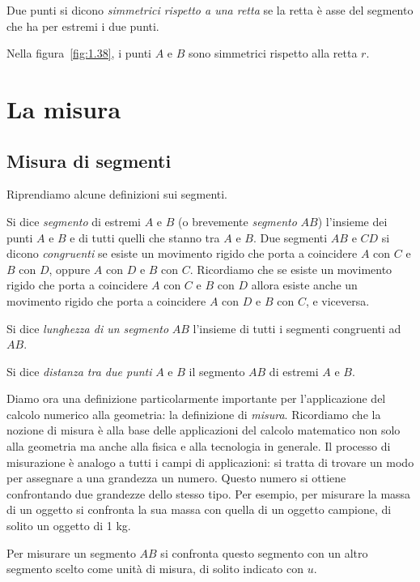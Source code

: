 \begin{definizione}
Due punti si dicono \emph{simmetrici rispetto a una retta} se la retta è asse del segmento che ha per estremi i due punti.
\end{definizione}

Nella figura~\ref{fig:1.38}, i punti $A$ e $B$ sono simmetrici rispetto alla retta $r$.

\section{La misura}

\subsection{Misura di segmenti}

Riprendiamo alcune definizioni sui segmenti.

Si dice \emph{segmento} di estremi $A$ e $B$ (o brevemente \emph{segmento} $AB$) l'insieme dei punti $A$ e $B$ e di tutti quelli che stanno tra $A$ e $B$.
Due segmenti $AB$ e $CD$ si dicono \emph{congruenti} se esiste un movimento rigido che porta a coincidere $A$ con $C$ e $B$ con $D$, oppure $A$ con $D$ e $B$ con $C$. Ricordiamo che se esiste un movimento rigido che porta a coincidere $A$ con $C$ e $B$ con $D$ allora esiste anche un movimento rigido che porta a coincidere $A$ con $D$ e $B$ con $C$, e viceversa.

Si dice \emph{lunghezza di un segmento} $AB$ l'insieme di tutti i segmenti congruenti ad $AB$.

Si dice \emph{distanza tra due punti} $A$ e $B$ il segmento $AB$ di estremi $A$ e $B$.

Diamo ora una definizione particolarmente importante per l'applicazione del calcolo numerico alla geometria: la definizione di \emph{misura}. Ricordiamo che la nozione di misura è alla base delle applicazioni del calcolo matematico non solo alla geometria ma anche alla fisica e alla tecnologia in generale. Il processo di misurazione è analogo a tutti i campi di applicazioni: si tratta di trovare un modo per assegnare a una grandezza un numero. Questo numero si ottiene confrontando due grandezze dello stesso tipo. Per esempio, per misurare la massa di un oggetto si confronta la sua massa con quella di un oggetto campione, di solito un oggetto di 1 kg.

Per misurare un segmento $AB$ si confronta questo segmento con un altro segmento scelto come unità di misura, di solito indicato con $u$.



